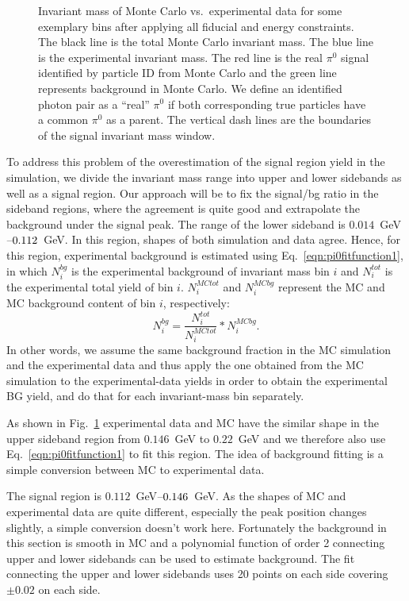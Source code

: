 \begin{figure}
      \caption[Invariant mass of Monte Carlo vs.~experimental data for some exemplary bins]{Invariant mass of Monte Carlo vs.~experimental data for some exemplary bins after applying all fiducial and energy constraints. The black line is the total Monte Carlo invariant mass. The blue line is the experimental invariant mass. The red line is the real $\pi^0$ signal identified by particle ID from Monte Carlo and the green line represents background in Monte Carlo. We define an identified photon pair as a ``real'' $\pi^0$ if both corresponding true particles have a common $\pi^0$ as a parent. The vertical dash lines are the boundaries of the signal invariant mass window.}
  \label{fig:pi0MC_Exp}
\end{figure}


To address this problem of the overestimation of the signal region yield in the simulation, we divide the invariant mass range into upper and lower sidebands as well as a signal region. Our approach will be to fix the signal/bg ratio in the sideband regions, where the agreement is quite good and extrapolate the background under the signal peak.
The range of the lower sideband is $0.014$~GeV$\textup{--}0.112$~GeV. In this region, shapes of both simulation and data agree. Hence, for this region, experimental background is estimated using Eq.~\eqref{eqn:pi0fitfunction1}, in which $N_i^{bg}$ is the experimental background of invariant mass bin $i$ and $N_i^{tot}$ is the experimental total yield of bin $i$. $N_i^{MCtot}$ and $N_i^{MCbg}$ represent the MC and MC background content of bin $i$, respectively:
\begin{equation}
N_i^{bg}=\frac{N_i^{tot}}{N_i^{MCtot}}*N_i^{MCbg}.
\label{eqn:pi0fitfunction1}
\end{equation}
In other words, we assume the same background fraction in the MC simulation and the experimental data and thus apply the one obtained from the MC simulation to the experimental-data yields in order to obtain the experimental BG yield, and do that for each invariant-mass bin separately.


As shown in Fig.~\ref{fig:pi0MC_Exp} experimental data and MC have the similar shape in the upper sideband region from $0.146$~GeV to $0.22$~GeV and we therefore also use Eq.~\eqref{eqn:pi0fitfunction1} to fit this region. The idea of background fitting is a simple conversion between MC to experimental data.

The signal region is $0.112$~GeV$\textup{--}0.146$~GeV. As the shapes of MC and experimental data are quite different, especially the peak position changes slightly, a simple conversion doesn't work here. Fortunately the background in this section is smooth in MC and a polynomial function of order 2 connecting upper and lower sidebands can be used to estimate background.
The fit connecting the upper and lower sidebands uses 20 points on each side covering $\pm 0.02$ on each side.

